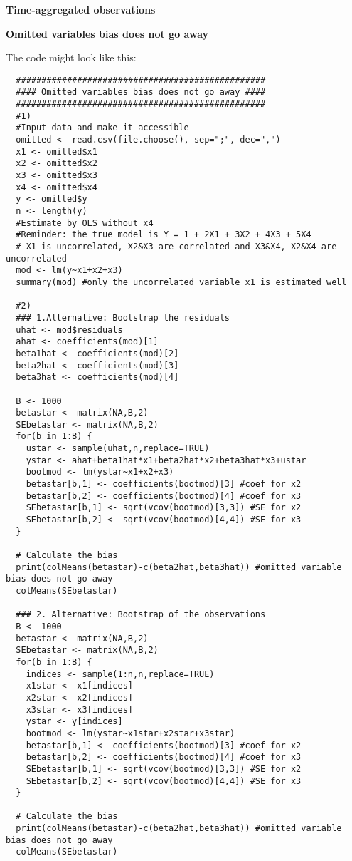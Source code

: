\begin{Solution}{15.5}
\textbf{Time-aggregated observations}
\end{Solution}
\begin{Solution}{16.1}
\textbf{Omitted variables bias does not go away }

The code might look like this:
\begin{verbatim}
  #################################################
  #### Omitted variables bias does not go away ####
  #################################################
  #1)
  #Input data and make it accessible
  omitted <- read.csv(file.choose(), sep=";", dec=",")
  x1 <- omitted$x1
  x2 <- omitted$x2
  x3 <- omitted$x3
  x4 <- omitted$x4
  y <- omitted$y
  n <- length(y)
  #Estimate by OLS without x4
  #Reminder: the true model is Y = 1 + 2X1 + 3X2 + 4X3 + 5X4
  # X1 is uncorrelated, X2&X3 are correlated and X3&X4, X2&X4 are uncorrelated
  mod <- lm(y~x1+x2+x3)
  summary(mod) #only the uncorrelated variable x1 is estimated well

  #2)
  ### 1.Alternative: Bootstrap the residuals
  uhat <- mod$residuals
  ahat <- coefficients(mod)[1]
  beta1hat <- coefficients(mod)[2]
  beta2hat <- coefficients(mod)[3]
  beta3hat <- coefficients(mod)[4]

  B <- 1000
  betastar <- matrix(NA,B,2)
  SEbetastar <- matrix(NA,B,2)
  for(b in 1:B) {
    ustar <- sample(uhat,n,replace=TRUE)
    ystar <- ahat+beta1hat*x1+beta2hat*x2+beta3hat*x3+ustar
    bootmod <- lm(ystar~x1+x2+x3)
    betastar[b,1] <- coefficients(bootmod)[3] #coef for x2
    betastar[b,2] <- coefficients(bootmod)[4] #coef for x3
    SEbetastar[b,1] <- sqrt(vcov(bootmod)[3,3]) #SE for x2
    SEbetastar[b,2] <- sqrt(vcov(bootmod)[4,4]) #SE for x3
  }

  # Calculate the bias
  print(colMeans(betastar)-c(beta2hat,beta3hat)) #omitted variable bias does not go away
  colMeans(SEbetastar)

  ### 2. Alternative: Bootstrap of the observations
  B <- 1000
  betastar <- matrix(NA,B,2)
  SEbetastar <- matrix(NA,B,2)
  for(b in 1:B) {
    indices <- sample(1:n,n,replace=TRUE)
    x1star <- x1[indices]
    x2star <- x2[indices]
    x3star <- x3[indices]
    ystar <- y[indices]
    bootmod <- lm(ystar~x1star+x2star+x3star)
    betastar[b,1] <- coefficients(bootmod)[3] #coef for x2
    betastar[b,2] <- coefficients(bootmod)[4] #coef for x3
    SEbetastar[b,1] <- sqrt(vcov(bootmod)[3,3]) #SE for x2
    SEbetastar[b,2] <- sqrt(vcov(bootmod)[4,4]) #SE for x3
  }

  # Calculate the bias
  print(colMeans(betastar)-c(beta2hat,beta3hat)) #omitted variable bias does not go away
  colMeans(SEbetastar)
\end{verbatim}
\end{Solution}
